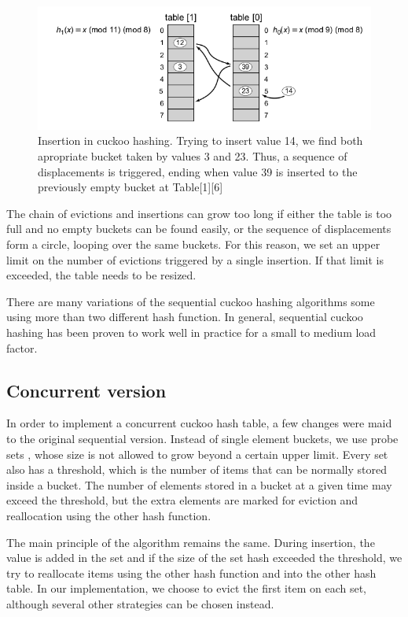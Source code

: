 \begin{figure}
 \centering
  \includegraphics[scale=0.5]{cuckoo_hashing.png}
\caption{Insertion in cuckoo hashing. Trying to insert value 14, we find both apropriate bucket taken by values 3 and 23. Thus, a sequence of displacements is triggered, ending when value 39 is inserted to the previously empty bucket at Table[1][6] }
\end{figure}

The chain of evictions and insertions can grow too long if either the table is too full and no empty buckets can be found easily, or the sequence of displacements form a circle, looping over the same buckets. For this reason, we set an upper limit on the number of evictions triggered by a single insertion. If that limit is exceeded, the table needs to be resized.

There are many variations of the sequential cuckoo hashing algorithms some using more than two different hash function. In general, sequential cuckoo hashing has been proven to work well in practice for a small  to medium load factor.

\subsection{Concurrent version}

In order to implement a concurrent cuckoo hash table, a few changes were maid to the original sequential version. Instead of single element buckets, we use probe sets , whose size is not allowed to grow beyond a certain upper limit. Every set also has a threshold, which is the number of items that can be normally stored inside a bucket. The number of elements stored in a bucket at a given time may exceed the threshold, but the extra elements are marked for eviction and reallocation using the other hash function.

The main principle of the algorithm remains the same. During insertion, the value is added in the set and if the size of the set hash exceeded the threshold, we try to reallocate items using the other hash function and into the other hash table.  In our implementation, we choose to evict the first item on each set, although several other strategies can be chosen instead.

